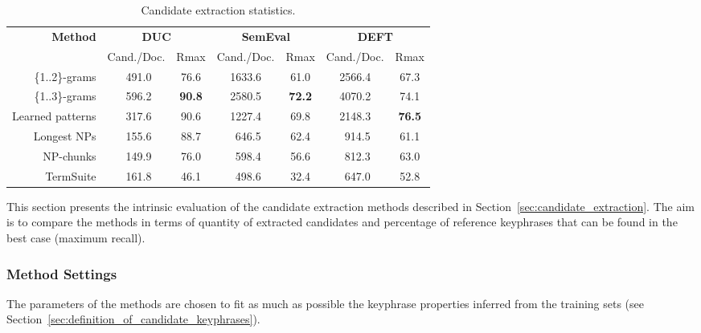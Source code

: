     \begin{table*}
      \centering
      \begin{tabular}{@{~}rcccccc@{~}}
        \toprule
        \multirow{2}{*}[-2pt]{\textbf{Method}} & \multicolumn{2}{c}{\textbf{DUC}} & \multicolumn{2}{c}{\textbf{SemEval}} & \multicolumn{2}{c}{\textbf{DEFT}}\\
        \cmidrule(r){2-3}\cmidrule(lr){4-5}\cmidrule(l){6-7}
        & Cand./Doc. & Rmax & Cand./Doc. & Rmax & Cand./Doc. & Rmax\\
        \midrule
        \{1..2\}-grams & $~~$491.0 & 76.6 & 1633.6 & 61.0 & 2566.4 & 67.3\\
        \{1..3\}-grams & $~~$596.2 & \textbf{90.8} & 2580.5 & \textbf{72.2} & 4070.2 & 74.1\\
        Learned patterns & $~~$317.6 & 90.6 & 1227.4 & 69.8 & 2148.3 & \textbf{76.5}\\
        Longest NPs & $~~$155.6 & 88.7 & $~~$646.5 & 62.4 & $~~$914.5 & 61.1\\
        NP-chunks & $~~$149.9 & 76.0 & $~~$598.4 & 56.6 & $~~$812.3 & 63.0\\
        TermSuite & $~~$161.8 & 46.1 & $~~$498.6 & 32.4 & $~~$647.0 & 52.8\\
        \bottomrule
      \end{tabular}
      \caption{Candidate extraction statistics.
               \label{tab:candidate_extraction_statistics}}
    \end{table*}

    This section presents the intrinsic evaluation of the candidate extraction
    methods described in Section~\ref{sec:candidate_extraction}. The aim is to
    compare the methods in terms of quantity of extracted candidates and
    percentage of reference keyphrases that can be found in the best case
    (maximum recall).

    \subsubsection{Method Settings}
    \label{subsubsec:method_settings}
      The parameters of the methods are chosen to fit as much as possible the
      keyphrase properties inferred from the training sets (see
      Section~\ref{sec:definition_of_candidate_keyphrases}).

